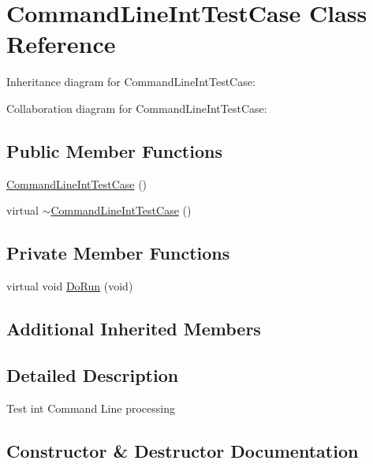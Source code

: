 \hypertarget{classCommandLineIntTestCase}{}\section{Command\+Line\+Int\+Test\+Case Class Reference}
\label{classCommandLineIntTestCase}


Inheritance diagram for Command\+Line\+Int\+Test\+Case\+:


Collaboration diagram for Command\+Line\+Int\+Test\+Case\+:
\subsection*{Public Member Functions}
\begin{DoxyCompactItemize}
\item 
\hyperlink{classCommandLineIntTestCase_a71ba5781c77fda2cff27eb5911b95c5f}{Command\+Line\+Int\+Test\+Case} ()
\item 
virtual \hyperlink{classCommandLineIntTestCase_af3b9432917268a29407f2c55e4794d87}{$\sim$\+Command\+Line\+Int\+Test\+Case} ()
\end{DoxyCompactItemize}
\subsection*{Private Member Functions}
\begin{DoxyCompactItemize}
\item 
virtual void \hyperlink{classCommandLineIntTestCase_af3df43f16f961e471a638094a2465c8c}{Do\+Run} (void)
\end{DoxyCompactItemize}
\subsection*{Additional Inherited Members}


\subsection{Detailed Description}
Test int Command Line processing 

\subsection{Constructor \& Destructor Documentation}

